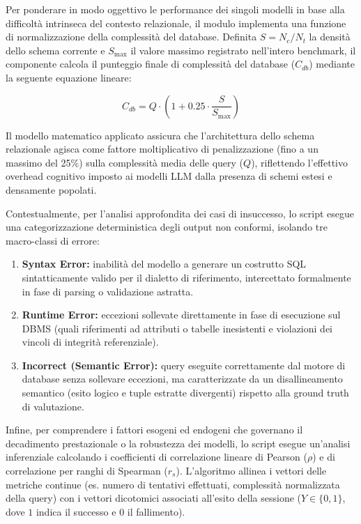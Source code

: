 Per ponderare in modo oggettivo le performance dei singoli modelli in
base alla difficoltà intrinseca del contesto relazionale, il modulo
implementa una funzione di normalizzazione della complessità del
database. Definita \(S = N_c / N_t\) la densità dello schema corrente e
\(S_{\max}\) il valore massimo registrato nell'intero benchmark, il
componente calcola il punteggio finale di complessità del database
(\(C_{db}\)) mediante la seguente equazione lineare:

\[
C_{db} = Q \cdot \left(1 + 0.25 \cdot \frac{S}{S_{\max}}\right)
\]

Il modello matematico applicato assicura che l'architettura dello schema
relazionale agisca come fattore moltiplicativo di penalizzazione (fino a
un massimo del 25\%) sulla complessità media delle query (\(Q\)),
riflettendo l'effettivo overhead cognitivo imposto ai modelli LLM
dalla presenza di schemi estesi e densamente popolati.

Contestualmente, per l'analisi approfondita dei casi di insuccesso, lo
script esegue una categorizzazione deterministica degli output non
conformi, isolando tre macro-classi di errore:

\begin{enumerate}
\def\labelenumi{\arabic{enumi}.}
\item
  \textbf{Syntax Error:} inabilità del modello a generare un costrutto
  SQL sintatticamente valido per il dialetto di riferimento,
  intercettato formalmente in fase di parsing o validazione astratta.
\item
  \textbf{Runtime Error:} eccezioni sollevate direttamente in fase di
  esecuzione sul DBMS (quali riferimenti ad attributi o tabelle
  inesistenti e violazioni dei vincoli di integrità referenziale).
\item
  \textbf{Incorrect (Semantic Error):} query eseguite correttamente dal
  motore di database senza sollevare eccezioni, ma caratterizzate da un
  disallineamento semantico (esito logico e tuple estratte divergenti)
  rispetto alla ground truth di valutazione.
\end{enumerate}

Infine, per comprendere i fattori esogeni ed endogeni che governano il
decadimento prestazionale o la robustezza dei modelli, lo script esegue
un'analisi inferenziale calcolando i coefficienti di correlazione
lineare di Pearson (\(\rho\)) e di correlazione per ranghi di Spearman
(\(r_s\)). L'algoritmo allinea i vettori delle metriche continue (es.
numero di tentativi effettuati, complessità normalizzata della query)
con i vettori dicotomici associati all'esito della sessione
(\(Y \in \{0, 1\}\), dove \(1\) indica il successo e \(0\) il
fallimento).

